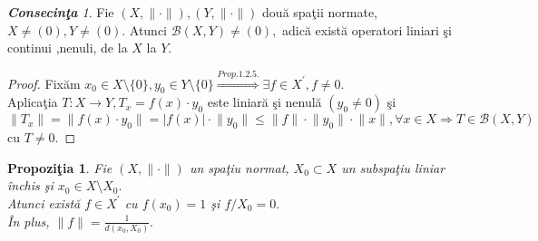 \documentclass[ a4paper, 12pt]{report}
\newtheorem{prop}[theorem]{\bf Propozi\c tia }
\theoremstyle{remark}
\newtheorem{cons}{\bf Consecin\c ta }[section]
\numberwithin{equation}{section}
\begin{document}
\begin{cons}
Fie $(X, \lVert \cdot \rVert), (Y,\lVert \cdot  \rVert)$ dou\u a spa\c tii normate,\\ $X \neq (0), Y \neq (0)$. Atunci $\mathcal{B}(X,Y) \neq (0),$ adic\u a exist\u a operatori liniari \c si continui ,nenuli, de la $X$ la $Y$.
\end{cons}
\begin{proof}
Fix\u am $x_0 \in X\setminus \{ 0 \}, y_0 \in Y \setminus \{ 0 \} \stackrel{Prop.1.2.5.}{\Longrightarrow} \exists f \in X^{'}, f \neq 0.$\\
Aplica\c tia $T : X \rightarrow Y, T_x = f(x) \cdot y_0$ este liniar\u a \c si nenul\u a $(y_0 \neq 0)$ \c si $\lVert T_x \rVert = \lVert f(x) \cdot y_0 \rVert = \lvert f(x) \rvert \cdot \lVert y_0 \rVert \leq \lVert f  \rVert \cdot \lVert y_0 \rVert \cdot \lVert x \rVert, \forall x \in X \Rightarrow T \in \mathcal{B}(X,Y) $ cu $T \neq 0.$
\end{proof}
\begin{prop}
Fie $(X,\lVert \cdot \rVert)$ un spa\c tiu normat, $X_0 \subset X$ un subspa\c tiu liniar \^inchis \c si $x_0 \in X \setminus X_0.$\\
Atunci exist\u a $f \in X^{'}$ cu $f(x_0) = 1$ \c si $f/X_0 = 0.$\\
\^In plus, $\lVert f \rVert = \frac{1}{d(x_0,X_0)}.$
\end{prop}
\end{document}

